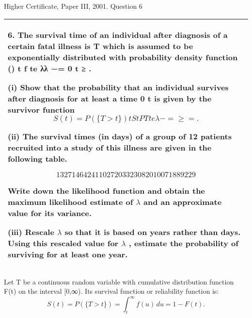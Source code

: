 \documentclass[a4paper,12pt]{article}
\begin{document}


Higher Certificate, Paper III, 2001. Question 6



\begin{table}[ht!]
     


\centering
     


\begin{tabular}{|p{15cm}|}
     


\hline 

6. The survival time of an individual after diagnosis of a certain fatal illness is T which is assumed to be exponentially 
distributed with probability density function 
  () t f te λλ −=       0 t ≥ . 
 
(i) Show that the probability that an individual survives after diagnosis for at least a time 0 t is given by the survivor function 
 \[ S(t)=P(\{T>t\}) tS t P T t e λ − = ≥ =.  \]
 
(ii) The survival times (in days) of a group of 12 patients recruited into a study of this illness are given in the following table. 
 
\[1327 1464 241 1027 20 332 308 20 100 71 889 229\]
 
 
Write down the likelihood function and obtain the maximum likelihood estimate of $\lambda$  and an approximate value for its variance.
 
(iii) Rescale $\lambda$ so that it is based on years rather than days.  Using this rescaled value for $\lambda$  , estimate the probability of surviving for at least one year.  
 
 
\\ \hline



\end{tabular}
    


\end{table}


\begin{framed}
Let T be a continuous random variable with cumulative distribution function F(t) on the interval [0,∞). Its survival function or reliability function is: 
\[ {\displaystyle S(t)=P(\{T>t\})=\int _{t}^{\infty }f(u)\,du=1-F(t).} \]
\end{framed}
\end{document}
